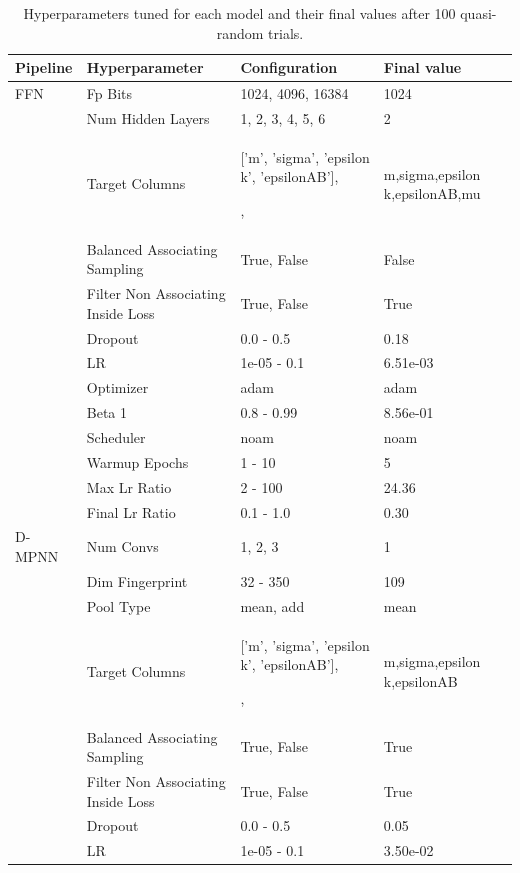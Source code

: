 \begin{table}
	\caption{Hyperparameters tuned for each model and their final values after 100 quasi-random trials.}
        \tiny
	\begin{center}
		\begin{tabular}{lp{}p{}l}
			Pipeline & Hyperparameter & Configuration & Final value \\
			\hline
			FFN & Fp Bits & 1024, 4096, 16384 & 1024 \\
			 & Num Hidden Layers & 1, 2, 3, 4, 5, 6 & 2 \\
			 & Target Columns & ['m', 'sigma', 'epsilon k', 'epsilonAB'],\par['m', 'sigma', 'epsilon k', 'epsilonAB', 'KAB'],\par['m', 'sigma', 'epsilon k', 'epsilonAB', 'mu'] & m,sigma,epsilon k,epsilonAB,mu \\
			 & Balanced Associating Sampling & True, False & False \\
			 & Filter Non Associating Inside Loss & True, False & True \\
			 & Dropout & 0.0 - 0.5 & 0.18 \\
			 & LR & 1e-05 - 0.1 & 6.51e-03 \\
			 & Optimizer & adam & adam \\
			 & Beta 1 & 0.8 - 0.99 & 8.56e-01 \\
			 & Scheduler & noam & noam \\
			 & Warmup Epochs & 1 - 10 & 5 \\
			 & Max Lr Ratio & 2 - 100 & 24.36 \\
			 & Final Lr Ratio & 0.1 - 1.0 & 0.30 \\
			D-MPNN & Num Convs & 1, 2, 3 & 1 \\
			 & Dim Fingerprint & 32 - 350 & 109 \\
			 & Pool Type & mean, add & mean \\
			 & Target Columns & ['m', 'sigma', 'epsilon k', 'epsilonAB'],\par['m', 'sigma', 'epsilon k', 'epsilonAB', 'KAB'],\par['m', 'sigma', 'epsilon k', 'epsilonAB', 'mu'] & m,sigma,epsilon k,epsilonAB \\
			 & Balanced Associating Sampling & True, False & True \\
			 & Filter Non Associating Inside Loss & True, False & True \\
			 & Dropout & 0.0 - 0.5 & 0.05 \\
			 & LR & 1e-05 - 0.1 & 3.50e-02 \\

\end{tabular}
\end{center}
\end{table}
